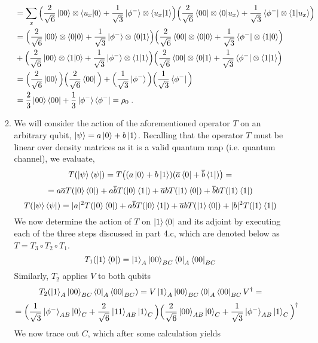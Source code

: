 \documentclass[12pt]{article}
\begin{document}
\begin{enumerate}
\begin{enumerate}
\begin{align*}
 &=
 \sum_x 
\Big(
\frac{2}{\sqrt{6}} \ket{00}\otimes\langle u_x \vert 0\rangle + \frac{1}{\sqrt{3}} \ket{\phi^-}\otimes \langle u_x \vert 1\rangle\Big)
\Big(
\frac{2}{\sqrt{6}} \bra{00}\otimes \langle 0 \vert u_x\rangle + \frac{1}{\sqrt{3}} \bra{\phi^-}\otimes \langle 1 \vert u_x\rangle\Big) \\
&=
\Big(
\frac{2}{\sqrt{6}} \ket{00}\otimes\langle 0 \vert 0\rangle + \frac{1}{\sqrt{3}} \ket{\phi^-}\otimes \langle 0 \vert 1\rangle\Big)
\Big(
\frac{2}{\sqrt{6}} \bra{00}\otimes \langle 0 \vert 0\rangle + \frac{1}{\sqrt{3}} \bra{\phi^-}\otimes \langle 1 \vert 0\rangle\Big) \\
&+
\Big(
\frac{2}{\sqrt{6}} \ket{00}\otimes\langle 1 \vert 0\rangle + \frac{1}{\sqrt{3}} \ket{\phi^-}\otimes \langle 1 \vert 1\rangle\Big)
\Big(
\frac{2}{\sqrt{6}} \bra{00}\otimes \langle 0 \vert 1\rangle + \frac{1}{\sqrt{3}} \bra{\phi^-}\otimes \langle 1 \vert 1\rangle\Big)\\
&=
\Big(
\frac{2}{\sqrt{6}} \ket{00} \Big)
\Big(
\frac{2}{\sqrt{6}} \bra{00} \Big) + 
\Big(
\frac{1}{\sqrt{3}} \ket{\phi^-}\Big)
\Big(
\frac{1}{\sqrt{3}} \bra{\phi^-}\Big)\\
&= \frac{2}{3} \ket{00}\bra{00} + \frac{1}{3} \ket{\phi^-}\bra{\phi^-} = \rho_0 \;.
\end{align*}
\item
We will consider the action of the aforementioned operator $T$ on an arbitrary qubit, $\ket{\psi} = a \ket{0} + b\ket{1}$. Recalling that the operator $T$ must be linear over density matrices as it is a valid quantum map (i.e. quantum channel), we evaluate,
$$ T(\ket{\psi} \bra{\psi}) = T\big( (a\ket{0} + b\ket{1}) (\overline{a} \bra{0} + \overline{b} \bra{1}) \big) = $$ 
$$ = a\overline{a} T(\ket{0} \bra{0}) + a \overline{b} T(\ket{0} \bra{1}) + \overline{a} b T(\ket{1} \bra{0}) + \overline{b} b T(\ket{1} \bra{1}) $$
$$ T(\ket{\psi} \bra{\psi}) = |a|^2 T(\ket{0} \bra{0}) + a \overline{b} T(\ket{0} \bra{1}) + \overline{a} b T(\ket{1} \bra{0}) + |b|^2 T(\ket{1} \bra{1}) $$
We now determine the action of $T$ on $\ket{1} \bra{0}$ and its adjoint by executing each of the three steps discussed in part 4.c, which are denoted below as $T = T_3\circ T_2 \circ T_1$.
$$ T_1(\ket{1} \bra{0}) = \ket{1}_A \ket{00}_{BC} \bra{0}_A \bra{00}_{BC} $$
Similarly, $T_2$ applies $V$ to both qubits
$$ T_2(\ket{1}_A \ket{00}_{BC} \bra{0}_A \bra{00}_{BC}) = V\ket{1}_A \ket{00}_{BC} \bra{0}_A \bra{00}_{BC} V^\dagger = $$
$$ = \Big(\frac{1}{\sqrt{3}}\ket{\phi^-}_{AB} \ket{0}_C + \frac{2}{\sqrt{6}} \ket{11}_{AB}\ket{1}_C
\Big)\Big( \frac{2}{\sqrt{6}} \ket{00}_{AB}\ket{0}_C +
\frac{1}{\sqrt{3}}\ket{\phi^-}_{AB} \ket{1}_C \Big)^\dagger
 $$
We now trace out $C$, which after some calculation yields

\end{enumerate}
\end{enumerate}
\end{document}
